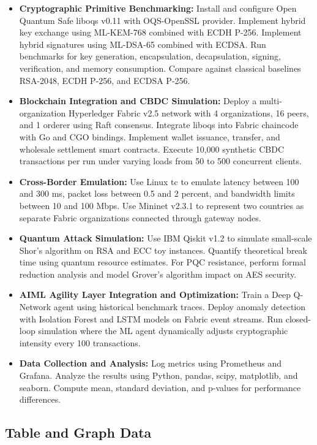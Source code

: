 \documentclass[pdflatex,sn-basic,english]{sn-jnl}
\begin{document}
\begin{itemize}
    \item \textbf{Cryptographic Primitive Benchmarking:}
    Install and configure Open Quantum Safe liboqs v0.11 with OQS-OpenSSL provider. Implement hybrid key exchange using ML-KEM-768 combined with ECDH P-256. Implement hybrid signatures using ML-DSA-65 combined with ECDSA. Run benchmarks for key generation, encapsulation, decapsulation, signing, verification, and memory consumption. Compare against classical baselines RSA-2048, ECDH P-256, and ECDSA P-256.
    \item \textbf{Blockchain Integration and CBDC Simulation:}
    Deploy a multi-organization Hyperledger Fabric v2.5 network with 4 organizations, 16 peers, and 1 orderer using Raft consensus. Integrate liboqs into Fabric chaincode with Go and CGO bindings. Implement wallet issuance, transfer, and wholesale settlement smart contracts. Execute 10,000 synthetic CBDC transactions per run under varying loads from 50 to 500 concurrent clients.
    \item \textbf{Cross-Border Emulation:}
    Use Linux tc to emulate latency between 100 and 300 ms, packet loss between 0.5 and 2 percent, and bandwidth limits between 10 and 100 Mbps. Use Mininet v2.3.1 to represent two countries as separate Fabric organizations connected through gateway nodes.
    \item \textbf{Quantum Attack Simulation:}
    Use IBM Qiskit v1.2 to simulate small-scale Shor's algorithm on RSA and ECC toy instances. Quantify theoretical break time using quantum resource estimates. For PQC resistance, perform formal reduction analysis and model Grover's algorithm impact on AES security.
    \item \textbf{AIML Agility Layer Integration and Optimization:}
    Train a Deep Q-Network agent using historical benchmark traces. Deploy anomaly detection with Isolation Forest and LSTM models on Fabric event streams. Run closed-loop simulation where the ML agent dynamically adjusts cryptographic intensity every 100 transactions.
    \item \textbf{Data Collection and Analysis:}
    Log metrics using Prometheus and Grafana. Analyze the results using Python, pandas, scipy, matplotlib, and seaborn. Compute mean, standard deviation, and p-values for performance differences.
\end{itemize}

\subsection{Table and Graph Data}
\end{document}
